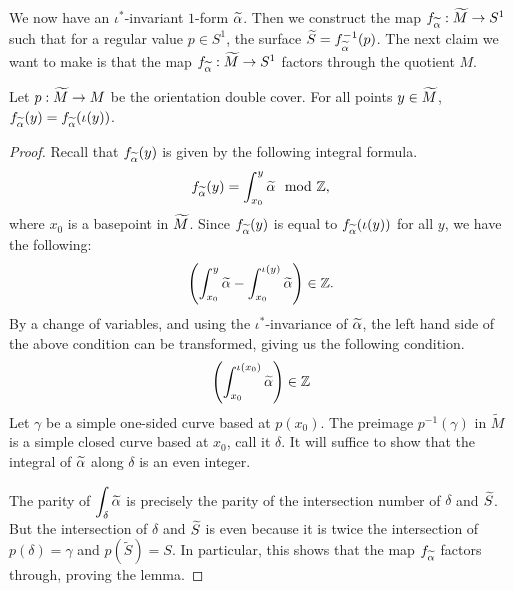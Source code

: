 We now have an $\iota^{\ast}$-invariant $1$-form $\widetilde{\alpha}$.  Then we construct the map $f_{\widetilde{\alpha}}:\widetilde{M}\rightarrow S^1$ such that for a regular value $p\in S^1$, the surface $\widetilde{S}=f_{\widetilde{\alpha}}^{-1}(p)$. The next claim we want to make is that the map $f_{\widetilde{\alpha}}: \widetilde{M} \to S^1$ factors through the quotient $M$.
\begin{lem}
  \label{lem:PD2}
Let $p:\widetilde{M}\rightarrow M$ be the orientation double cover. For all points $y \in \widetilde{M}$, $f_{\widetilde{\alpha}}(y) = f_{\widetilde{\alpha}}(\iota (y))$.
\end{lem}
\begin{proof}
  Recall that $f_{\widetilde{\alpha}}(y)$ is given by the following integral formula.
  \begin{align*}
    f_{\widetilde{\alpha}}(y) = \int_{x_0}^y \widetilde{\alpha} \mod {\mathbb{Z}},
  \end{align*}
  where $x_0$ is a basepoint in $\widetilde{M}$. Since $f_{\widetilde{\alpha}}(y)$ is equal to
  $f_{\widetilde{\alpha}}(\iota(y))$ for all $y$, we have the following:
  \begin{align*}
    \left(  \int_{x_0}^y \widetilde{\alpha} - \int_{x_0}^{\iota(y)} \widetilde{\alpha} \right) \in \mathbb{Z}.
  \end{align*}
  By a change of variables, and using the $\iota^{\ast}$-invariance of $\widetilde{\alpha}$, the left hand
  side of the above condition can be transformed, giving us the following condition.
  \begin{align*}
    \label{cond:integer}
    \left( \int_{x_0}^{\iota(x_0)} \widetilde{\alpha} \right) \in \mathbb{Z}
  \end{align*}
  Let $\gamma$ be a simple one-sided curve based at $p(x_0)$. The preimage $p^{-1}(\gamma)$ in $\widetilde{M}$ is a simple closed curve based at $x_0$, call it $\delta$.  It will suffice to show that the integral of
  $\widetilde{\alpha}$ along $\delta$ is an even integer.

  The parity of $\displaystyle \int_{\delta} \widetilde{\alpha}$ is precisely the parity
  of the intersection number of $\delta$ and $\widetilde{S}$.  But the intersection of $\delta$ and $\widetilde{S}$ is even because it is twice the intersection of $p(\delta)=\gamma$ and $p(\widetilde{S})=S$.   %
  In particular,
  this shows that the map $f_{\widetilde{\alpha}}$ factors through, proving the lemma.
\end{proof}
